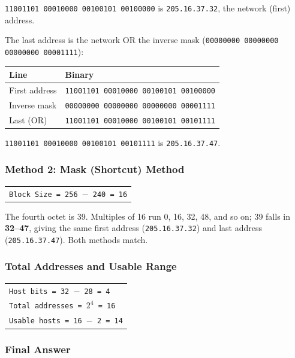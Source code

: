 \documentclass[11pt,a4paper]{article}
\begin{document}
\texttt{11001101 00010000 00100101 00100000} is \texttt{205.16.37.32}, the
network (first) address.

The last address is the network OR the inverse mask
(\texttt{00000000 00000000 00000000 00001111}):

\begin{tabularx}{\textwidth}{@{}lX@{}}
\toprule
\rowcolor{tablehead}\textbf{Line} & \textbf{Binary} \\
\midrule
First address & \texttt{11001101 00010000 00100101 00100000} \\
Inverse mask & \texttt{00000000 00000000 00000000 00001111} \\
Last (OR) & \texttt{11001101 00010000 00100101 00101111} \\
\bottomrule
\end{tabularx}

\texttt{11001101 00010000 00100101 00101111} is \texttt{205.16.37.47}.

\subsubsection*{Method 2: Mask (Shortcut) Method}

\begin{tabularx}{\textwidth}{@{}X@{}}
\texttt{Block Size = 256 $-$ 240 = 16} \\
\end{tabularx}

The fourth octet is 39. Multiples of 16 run 0, 16, 32, 48, and so on; 39 falls
in \textbf{32--47}, giving the same first address (\texttt{205.16.37.32}) and
last address (\texttt{205.16.37.47}). Both methods match.

\subsubsection*{Total Addresses and Usable Range}

\begin{tabularx}{\textwidth}{@{}X@{}}
\texttt{Host bits = 32 $-$ 28 = 4} \\
\texttt{Total addresses = $2^{4}$ = 16} \\
\texttt{Usable hosts = 16 $-$ 2 = 14} \\
\end{tabularx}

\subsubsection*{Final Answer}
\end{document}
